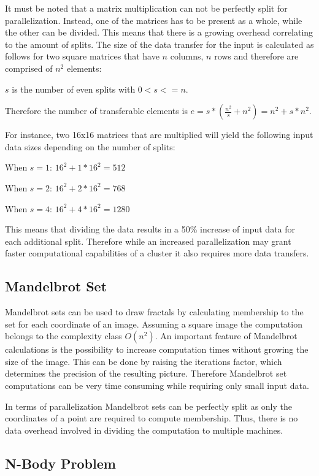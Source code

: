 It must be noted that a matrix multiplication can not be perfectly split for parallelization. Instead, one of the matrices has to be present as a whole, while the other can be divided. This means that there is a growing overhead correlating to the amount of splits. The size of the data transfer for the input is calculated as follows for two square matrices that have $n$ columns, $n$ rows and therefore are comprised of $n^2$ elements:

$s$ is the number of even splits with $0 < s <= n$.

Therefore the number of transferable elements is
$e = s*(\frac{n^2}{s}+n^2) = n^2 + s*n^2$.

For instance, two 16x16 matrices that are multiplied will yield the following input data sizes depending on the number of splits:

When $s=1$: $16^2+1*16^2 = 512$

When $s=2$: $16^2+2*16^2 = 768$

When $s=4$: $16^2 + 4*16^2 = 1280$

This means that dividing the data results in a 50\% increase of input data for each additional split. Therefore while an increased parallelization may grant faster computational capabilities of a cluster it also requires more data transfers.

\subsection*{Mandelbrot Set}

Mandelbrot sets can be used to draw fractals by calculating membership to the set for each coordinate of an image. Assuming a square image the computation belongs to the complexity class $O(n^2)$. An important feature of Mandelbrot calculations is the possibility to increase computation times without growing the size of the image. This can be done by raising the iterations factor, which determines the precision of the resulting picture. Therefore Mandelbrot set computations can be very time consuming while requiring only small input data.

In terms of parallelization Mandelbrot sets can be perfectly split as only the coordinates of a point are required to compute membership. Thus, there is no data overhead involved in dividing the computation to multiple machines.

\subsection*{N-Body Problem}

